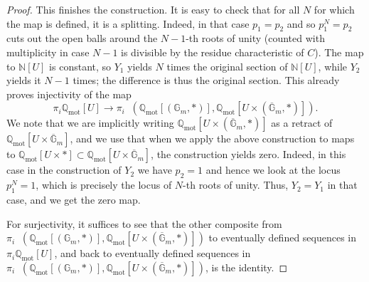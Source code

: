 \documentclass[11pt]{amsart}
\DeclareMathOperator{\intHom}{\!{\mathscr{H}\! om}}
\numberwithin{equation}{section}
\numberwithin{theorem}{section}
\theoremstyle{definition}
\begin{document}
\begin{proof}
This finishes the construction. It is easy to check that for all $N$ for which the map is defined, it is a splitting. Indeed, in that case $p_1=p_2$ and so $p_1^N=p_2$ cuts out the open balls around the $N-1$-th roots of unity (counted with multiplicity in case $N-1$ is divisible by the residue characteristic of $C$). The map to $\mathbb N[U]$ is constant, so $Y_1$ yields $N$ times the original section of $\mathbb N[U]$, while $Y_2$ yields it $N-1$ times; the difference is thus the original section. This already proves injectivity of the map
\[
\pi_i\mathbb Q_{\mathrm{mot}}[U]\to \pi_i\intHom(\mathbb Q_{\mathrm{mot}}[(\mathbb G_m,\ast)],\mathbb Q_{\mathrm{mot}}[U\times (\overline{\mathbb G}_m,\ast)]).
\]
We note that we are implicitly writing $\mathbb Q_{\mathrm{mot}}[U\times (\overline{\mathbb G}_m,\ast)]$ as a retract of $\mathbb Q_{\mathrm{mot}}[U\times \overline{\mathbb G}_m]$, and we use that when we apply the above construction to maps to $\mathbb Q_{\mathrm{mot}}[U\times \ast]\subset \mathbb Q_{\mathrm{mot}}[U\times \overline{\mathbb G}_m]$, the construction yields zero. Indeed, in this case in the construction of $Y_2$ we have $p_2=1$ and hence we look at the locus $p_1^N=1$, which is precisely the locus of $N$-th roots of unity. Thus, $Y_2=Y_1$ in that case, and we get the zero map.

For surjectivity, it suffices to see that the other composite from $\pi_i\intHom(\mathbb Q_{\mathrm{mot}}[(\mathbb G_m,\ast)],\mathbb Q_{\mathrm{mot}}[U\times (\overline{\mathbb G}_m,\ast)])$ to eventually defined sequences in $\pi_i\mathbb Q_{\mathrm{mot}}[U]$, and back to eventually defined sequences in $\pi_i \intHom(\mathbb Q_{\mathrm{mot}}[(\mathbb G_m,\ast)],\mathbb Q_{\mathrm{mot}}[U\times (\overline{\mathbb G}_m,\ast)])$, is the identity.


\end{proof}
\end{document}
